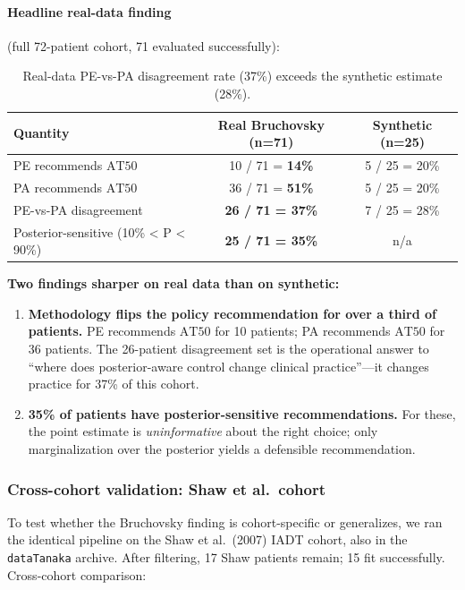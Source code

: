 \documentclass[11pt]{article}
\newcommand{\AT}{\mathrm{AT}}
\begin{document}
\paragraph{Headline real-data finding} (full 72-patient cohort, 71 evaluated
successfully):

\begin{table}[h]
\centering
\begin{tabular}{lcc}
\toprule
Quantity & Real Bruchovsky (n=71) & Synthetic (n=25) \\
\midrule
PE recommends $\AT 50$ & 10 / 71 = \textbf{14\%} & 5 / 25 = 20\% \\
PA recommends $\AT 50$ & 36 / 71 = \textbf{51\%} & 5 / 25 = 20\% \\
PE-vs-PA disagreement & \textbf{26 / 71 = 37\%} & 7 / 25 = 28\% \\
Posterior-sensitive (10\% < P < 90\%) & \textbf{25 / 71 = 35\%} & n/a \\
\bottomrule
\end{tabular}
\caption{Real-data PE-vs-PA disagreement rate (37\%) exceeds the synthetic
estimate (28\%).}
\end{table}

\textbf{Two findings sharper on real data than on synthetic:}
\begin{enumerate}
\item \textbf{Methodology flips the policy recommendation for over a third of
patients.} PE recommends $\AT 50$ for 10 patients; PA recommends $\AT 50$ for
36 patients. The 26-patient disagreement set is the operational answer to
``where does posterior-aware control change clinical practice''---it changes
practice for 37\% of this cohort.
\item \textbf{35\% of patients have posterior-sensitive recommendations.} For
these, the point estimate is \emph{uninformative} about the right choice; only
marginalization over the posterior yields a defensible recommendation.
\end{enumerate}

\subsubsection{Cross-cohort validation: Shaw et al.\ cohort}

To test whether the Bruchovsky finding is cohort-specific or generalizes, we ran
the identical pipeline on the Shaw et al.\ (2007) IADT cohort, also in the
\texttt{dataTanaka} archive. After filtering, 17 Shaw patients remain; 15 fit
successfully. Cross-cohort comparison:
\end{document}
